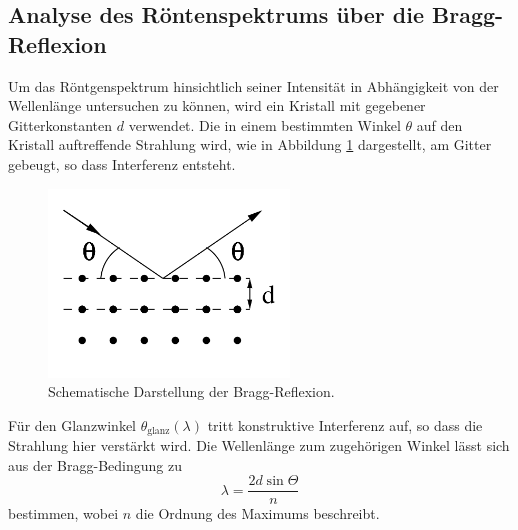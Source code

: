 \subsection{Analyse des Röntenspektrums über die Bragg-Reflexion}
Um das Röntgenspektrum hinsichtlich seiner Intensität in Abhängigkeit von der Wellenlänge untersuchen zu können, wird ein Kristall mit gegebener Gitterkonstanten $d$ verwendet.
Die in einem bestimmten Winkel $\theta$ auf den Kristall auftreffende Strahlung wird, wie in Abbildung \ref{abb:2} dargestellt, am Gitter gebeugt, so dass Interferenz entsteht.
\begin{figure}[H]
  \centering
  \includegraphics[height=5cm]{ressources/bragg.png}
  \caption{Schematische Darstellung der Bragg-Reflexion.\cite{skript}}
  \label{abb:2}
\end{figure}
Für den Glanzwinkel $\theta_{\text{glanz}}(\lambda)$ tritt konstruktive Interferenz auf, so dass die Strahlung hier verstärkt wird.
Die Wellenlänge zum zugehörigen Winkel lässt sich aus der Bragg-Bedingung zu
\begin{equation}
  \lambda = \frac{2 d \sin{\Theta}}{n}
  \label{eqn:bragg}
\end{equation}
bestimmen, wobei $n$ die Ordnung des Maximums beschreibt.
